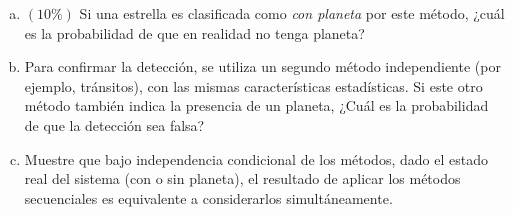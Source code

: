 \documentclass[a4paper]{article}
\begin{document}
\begin{enumerate}[a.]
	\item $(10\%)$ Si una estrella es clasificada como \textit{con planeta} por este método, ¿cuál es la probabilidad de que en realidad no tenga planeta?
	\item Para confirmar la detección, se utiliza un segundo método independiente (por ejemplo, tránsitos), con las mismas características estadísticas. Si este otro método también indica la presencia de un planeta, ¿Cuál es la probabilidad de que la detección sea falsa?
	\item Muestre que bajo independencia condicional de los métodos, dado el estado real del sistema (con o sin planeta), el resultado de aplicar los métodos secuenciales es equivalente a considerarlos simultáneamente.
\end{enumerate}
\end{document}
